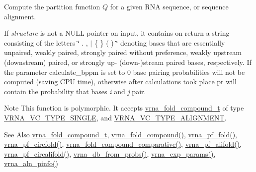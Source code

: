 Compute the partition function $Q$ for a given R\-N\-A sequence, or sequence alignment. 

If {\itshape structure} is not a N\-U\-L\-L pointer on input, it contains on return a string consisting of the letters \char`\"{} . , $\vert$ \{ \} ( ) \char`\"{} denoting bases that are essentially unpaired, weakly paired, strongly paired without preference, weakly upstream (downstream) paired, or strongly up-\/ (down-\/)stream paired bases, respectively. If the parameter calculate\-\_\-bppm is set to 0 base pairing probabilities will not be computed (saving C\-P\-U time), otherwise after calculations took place \hyperlink{fold__vars_8h_ac98ec419070aee6831b44e5c700f090f}{pr} will contain the probability that bases {\itshape i} and {\itshape j} pair.

\begin{DoxyNote}{Note}
This function is polymorphic. It accepts \hyperlink{group__fold__compound_ga1b0cef17fd40466cef5968eaeeff6166}{vrna\-\_\-fold\-\_\-compound\-\_\-t} of type \hyperlink{group__fold__compound_gga01a4ff86fa71deaaa5d1abbd95a1447da1608d3aa78905fc39e0d25a624ac9512}{V\-R\-N\-A\-\_\-\-V\-C\-\_\-\-T\-Y\-P\-E\-\_\-\-S\-I\-N\-G\-L\-E}, and \hyperlink{group__fold__compound_gga01a4ff86fa71deaaa5d1abbd95a1447da056345f1bcfe7cd595d1fd437c05246d}{V\-R\-N\-A\-\_\-\-V\-C\-\_\-\-T\-Y\-P\-E\-\_\-\-A\-L\-I\-G\-N\-M\-E\-N\-T}.
\end{DoxyNote}
\begin{DoxySeeAlso}{See Also}
\hyperlink{group__fold__compound_ga1b0cef17fd40466cef5968eaeeff6166}{vrna\-\_\-fold\-\_\-compound\-\_\-t}, \hyperlink{group__fold__compound_ga6601d994ba32b11511b36f68b08403be}{vrna\-\_\-fold\-\_\-compound()}, \hyperlink{group__pf__fold_ga59935ba485ac90f0efb5a38e2962d879}{vrna\-\_\-pf\-\_\-fold()}, \hyperlink{group__pf__fold_ga6dc133fce577fc0370986f3a3301cd10}{vrna\-\_\-pf\-\_\-circfold()}, \hyperlink{group__fold__compound_gad6bacc816af274922b13d947f708aa0c}{vrna\-\_\-fold\-\_\-compound\-\_\-comparative()}, \hyperlink{group__consensus__pf__fold_gaef750636c70e597a85ee139197a4350d}{vrna\-\_\-pf\-\_\-alifold()}, \hyperlink{group__consensus__pf__fold_ga017209394a4c1e68d96cd47e61d16d25}{vrna\-\_\-pf\-\_\-circalifold()}, \hyperlink{group__struct__utils_ga0c28c410a5ab22d6ab9c77a84e8d5b44}{vrna\-\_\-db\-\_\-from\-\_\-probs()}, \hyperlink{group__energy__parameters_gab1f3016f96aa96bff020cdd904605afa}{vrna\-\_\-exp\-\_\-params()}, \hyperlink{group__aln__utils_gaf6421a1318586c59fea6a127ed9f65f3}{vrna\-\_\-aln\-\_\-pinfo()}
\end{DoxySeeAlso}

